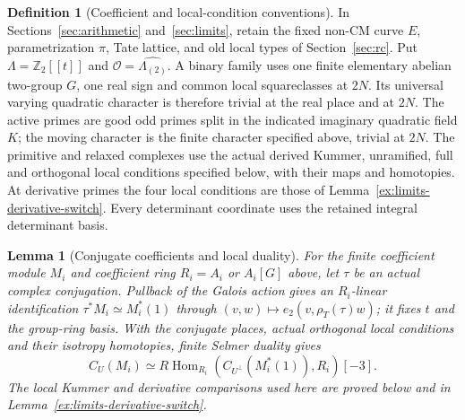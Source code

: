 \documentclass[11pt]{article}
\newtheorem{lemma}[theorem]{Lemma}
\theoremstyle{definition}
\newtheorem{definition}[theorem]{Definition}
\theoremstyle{remark}
\newcommand{\Z}{\mathbb Z}
\providecommand{\mathscr}[1]{\mathcal{#1}}
\begin{document}
\begin{definition}[Coefficient and local-condition conventions]
\label{ex:arith-data}
In Sections~\ref{sec:arithmetic} and~\ref{sec:limits}, retain the fixed
non-CM curve $E$, parametrization $\pi$, Tate lattice, and old local
types of Section~\ref{sec:rc}. Put $\Lambda=\Z_2[[t]]$ and
$\mathscr O=\widehat{\Lambda_{(2)}}$. A binary family uses one finite
elementary abelian two-group $G$, one real sign and common local
squareclasses at $2N$. Its universal varying quadratic character
is therefore trivial at the real place and at $2N$.
The active primes are good odd primes split in the indicated imaginary
quadratic field $K$; the moving character is the finite character
specified above, trivial at $2N$. The primitive and relaxed complexes
use the actual derived Kummer, unramified, full and orthogonal local
conditions specified below, with their maps and homotopies.
At derivative primes the four local conditions are those of
Lemma~\ref{ex:limits-derivative-switch}. Every determinant coordinate
uses the retained integral determinant basis.
\end{definition}
\begin{lemma}[Conjugate coefficients and local duality]\label{ex:arith-conjugate-duality}
For the finite coefficient module $M_i$ and coefficient ring
$R_i=A_i$ or $A_i[G]$ above, let $\tau$ be an actual complex
conjugation. Pullback of the Galois action gives an $R_i$-linear
identification $\tau^*M_i\simeq M_i^*(1)$ through
$(v,w)\mapsto e_2(v,\rho_T(\tau)w)$; it fixes $t$ and the group-ring
basis. With the conjugate places, actual orthogonal local conditions
and their isotropy homotopies, finite Selmer duality gives
\[
 C_U(M_i)\simeq
 R\operatorname{Hom}_{R_i}(C_{U^\perp}(M_i^*(1)),R_i)[-3].
\]
The local Kummer and derivative comparisons used here are proved
below and in Lemma~\ref{ex:limits-derivative-switch}.
\end{lemma}
\end{document}
